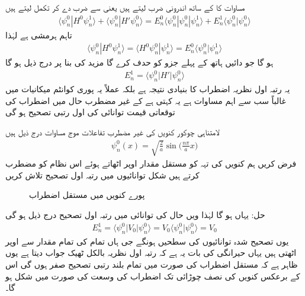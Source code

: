مساوات  کا  کے ساتھ اندرونی ضرب لیتے ہیں یعنی  سے ضرب دے کر تکمل لیتے ہیں 
\begin{align*}
\langle \psi_n^0 | H^0 \psi_n^1 \rangle + \langle \psi_n^0 | H' \psi_n^0 \rangle = E_n^0 \langle \psi_n^0 | \psi_n^0 | \psi_n^1 \rangle + E_n^1 \langle \psi_n^0 | \psi_n^0 \rangle
\end{align*}
تاہم  ہرمشی ہے لہٰذا
\begin{align*}
\langle \psi_n^0 | H^0 \psi_n^1 \rangle = \langle H^0 \psi_n^0 | \psi_n^1 \rangle = E_n^0 \langle \psi_n^0 | \psi_n^1 \rangle
\end{align*}
 ہو گا جو دائیں ہاتھ کے پہلے  جزو کو حدف کرے گا مزید   
کی بنا پر درج ذیل ہو گا 
\begin{align}
E_n^1 = \langle \psi_n^0 | H' | \psi_n^0 \rangle
\end{align}
یہ رتبہ اول نظریہ اضطراب کا بنیادی نتیجہ ہے بلکہ عملاً یہ پوری کوانٹم میکانیات میں غالباً سب سے اہم مساوات ہے یہ کہتی ہے کے  غیر  مضطرب حال میں اضطراب کی توقعاتی قیمت توانائی کی  اول رتبی   تصحیح ہو گی 

لامتناہی چوکور کنویں کی غیر مضطرب تفاعلات موج مساوات  درج ذیل ہیں  
\begin{align*}
\psi_n^0 (x) = \sqrt{\frac{2}{a}} \sin \big (\frac{n \pi}{a} x\big )
\end{align*}
 فرض کریں ہم کنویں کی تہہ کو مستقل مقدار  اوپر اٹھاتے ہوئے اس نظام کو مضطرب کرتے ہیں شکل    توانائیوں میں رتبہ اول  تصحیح تلاش کریں 

\begin{figure}
\centering
{}
\caption{پورے کنویں میں مستقل اضطراب}
\label{شکل_غیر_تابع_اضطراب_چکور_مستقل_اضطراب}
\end{figure}

حل: یہاں 
 ہو گا لہٰذا    ویں حال کی توانائی میں رتبہ اول تصحیح درج ذیل ہو گی
\begin{align*}
E_n^1 = \langle \psi_n^0 | V_0 | \psi_n^0 \rangle = V_0 \langle \psi_n^0 | \psi_n^0 \rangle = V_0
\end{align*}
یوں  تصحیح  شدہ توانائیوں کی سطحیں   ہونگے جی ہاں تمام کی تمام  مقدار سے اوپر  اٹھتی ہیں یہاں حیرانگی کی بات یہ ہے کہ رتبہ اول نظریہ بالکل ٹھیک جواب دیتا ہے یوں ظاہر ہے کہ مستقل اضطراب کی صورت میں تمام بلند رتبی تصحیح صفر ہوں گی  اس کے برعکس کنویں کی نصف چوڑائی تک اضطراب کی وسعت کی صورت میں شکل   ہو گا۔

